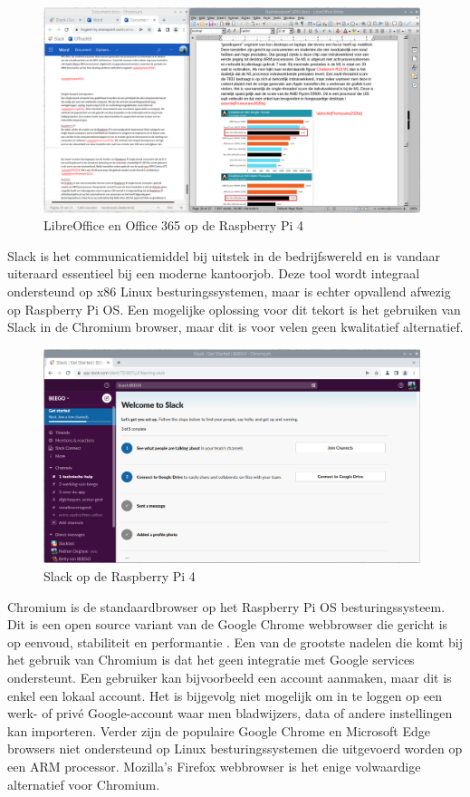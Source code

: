 \begin{figure}[!h]
	\centering
	\includegraphics[width=110mm, scale=0.7]{img/office_pi.png}
	\caption{LibreOffice en Office 365 op de Raspberry Pi 4}
\end{figure}

\newpage
Slack is het communicatiemiddel bij uitstek in de bedrijfswereld en is vandaar uiteraard essentieel bij een moderne kantoorjob. Deze tool wordt integraal ondersteund op x86 Linux besturingssystemen, maar is echter opvallend afwezig op Raspberry Pi OS. Een mogelijke oplossing voor dit tekort is het gebruiken van Slack in de Chromium browser, maar dit is voor velen geen kwalitatief alternatief.

\begin{figure}[!h]
	\centering
	\includegraphics[width=110mm, scale=0.7]{img/slack_pi.png}
	\caption{Slack op de Raspberry Pi 4}
\end{figure}

Chromium is de standaardbrowser op het Raspberry Pi OS besturingssysteem. Dit is een open source variant van de Google Chrome webbrowser die gericht is op eenvoud, stabiliteit en performantie \autocite{ChromiumProject2009}. Een van de grootste nadelen die komt bij het gebruik van Chromium is dat het geen integratie met Google services ondersteunt. Een gebruiker kan bijvoorbeeld een account aanmaken, maar dit is enkel een lokaal account. Het is bijgevolg niet mogelijk om in te loggen op een werk- of privé Google-account waar men bladwijzers, data of andere instellingen kan importeren. Verder zijn de populaire Google Chrome en Microsoft Edge browsers niet ondersteund op Linux besturingssystemen die uitgevoerd worden op een ARM processor. Mozilla’s Firefox webbrowser is het enige volwaardige alternatief voor Chromium.

